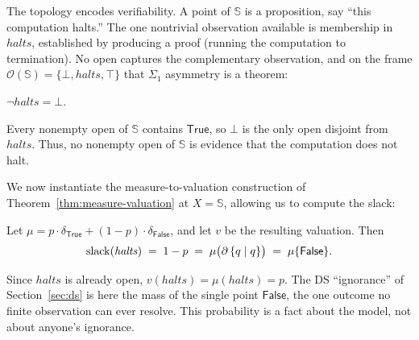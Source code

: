 \noindent
The topology encodes verifiability.  A point of $\mathbb{S}$ is a
proposition, say ``this computation halts.''  The one nontrivial
observation available is membership in $\mathit{halts}$, established
by producing a proof (running the computation to termination).  No
open captures the complementary observation, and on the frame
$\mathcal{O}(\mathbb{S}) = \{\bot, \mathit{halts}, \top\}$ that
$\Sigma_1$ asymmetry is a theorem:

\begin{theorem}
\label{thm:sigma1-asymmetry}
$\neg\mathit{halts} = \bot$.
\end{theorem}

\noindent
Every nonempty open of $\mathbb{S}$ contains $\mathsf{True}$, so
$\bot$ is the only open disjoint from $\mathit{halts}$. Thus, no nonempty
open of $\mathbb{S}$ is evidence that the computation does not halt.

We now instantiate the measure-to-valuation construction of
Theorem~\ref{thm:measure-valuation} at $X = \mathbb{S}$,
allowing us to compute the slack:

\begin{example}
\label{thm:slack-eq-boundary}
Let $\mu = p \cdot \delta_{\mathsf{True}} + (1-p) \cdot
\delta_{\mathsf{False}}$, and let $v$ be the resulting valuation.
Then
\[
  \mathrm{slack}(\mathit{halts}) \;=\; 1 - p \;=\;
  \mu\bigl(\partial\,\{q \mid q\}\bigr)
  \;=\; \mu\{\mathsf{False}\}.
\]
\end{example}

\noindent
Since $\mathit{halts}$ is already open, $v(\mathit{halts}) =
\mu(\mathit{halts}) = p$.  The DS ``ignorance'' of
Section~\ref{sec:ds} is here the mass of the single point
$\mathsf{False}$, the one outcome no finite observation can ever
resolve.  This probability is a fact about the model, not about
anyone's ignorance.

